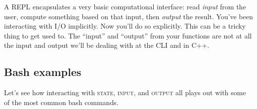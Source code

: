 \documentclass[nobib]{tufte-handout}
\begin{document}
A REPL encapsulates a very basic computational interface: read \textit{input} from the user, compute something based on that input, then \textit{output} the result. You've been interacting with I/O implicitly. Now you'll do so explicitly. This can be a tricky thing to get used to.  The ``input'' and ``output'' from your functions are not at all the input and output we'll be dealing with at the CLI and in C++.

\subsection{Bash examples}

Let's see how interacting with \textsc{state}, \textsc{input}, and \textsc{output} all plays out with some of the most common bash commands.
\end{document}
